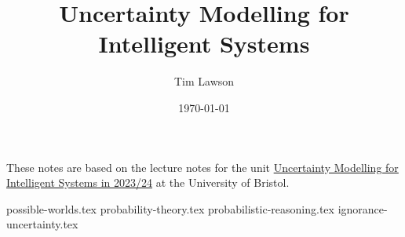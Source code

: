 \documentclass[a4paper]{extarticle}
\title{Uncertainty Modelling for Intelligent Systems}
\author{Tim Lawson}
\date{\today}
\numberwithin{equation}{section}
\theoremstyle{plain}
\begin{document}
\maketitle

These notes are based on the lecture notes for the unit
\href{https://www.bris.ac.uk/unit-programme-catalogue/UnitDetails.jsa?
  ayrCode=23\%2F24&unitCode=EMATM1120}
{Uncertainty Modelling for Intelligent Systems in 2023/24} at the University of
Bristol.

\tableofcontents

\newpage
\listoftheorems[numwidth=3em,title=Theorems]

{possible-worlds.tex}
{probability-theory.tex}
{probabilistic-reasoning.tex}
{ignorance-uncertainty.tex}
\end{document}
